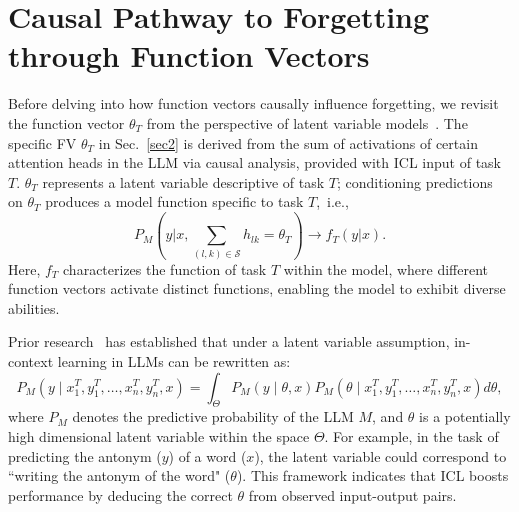 
\section{Causal Pathway to Forgetting through Function Vectors}
\label{sec5}
Before delving into how function vectors causally influence forgetting, we revisit
the function vector $ \theta_T $ from the perspective of latent variable models~\citep{baum1966statistical,gruber2007hidden}. 
The specific FV $\theta_T$ in Sec.~\ref{sec2} is derived from the sum of activations of certain attention heads in the LLM via causal analysis, provided with ICL input of task $T$. 
$\theta_T$ represents a latent variable descriptive of task $T$; conditioning predictions on $\theta_T$ produces 
a model function specific to task $T$,~i.e., 
\begin{equation}
\label{eq:func}
P_M(y|x, \sum_{(l, k) \in \mathcal{S}} h_{lk} = \theta_{T}) \rightarrow f_T(y|x).
\end{equation} 
Here, \( f_T \) characterizes the function of task $T$ within the model, where different function vectors activate distinct functions, enabling the model to exhibit diverse abilities.



Prior research~\citep{xie2021explanation, wang2024large} has established that under a latent variable assumption, in-context learning in LLMs can be rewritten as:
\begin{equation}
P_M\left(y \mid x^T_1, y^T_1, \ldots, x_n^T, y_n^T, x\right)=\int_{\Theta} P_M(y \mid \theta, x) P_M\left( \theta \mid x^T_1, y^T_1, \ldots, x_n^T, y_n^T, x\right) d \theta,
\end{equation}
where \( P_M \) denotes the predictive probability of the LLM $M$, and $\theta$ is a potentially high dimensional latent variable within the space $\Theta$. For example, in the task of
predicting the antonym ($y$) of a word ($x$), the latent variable could correspond to “writing the antonym of the word" ($\theta$).
This framework indicates that ICL boosts performance by deducing the correct $\theta$ from observed input-output pairs.

